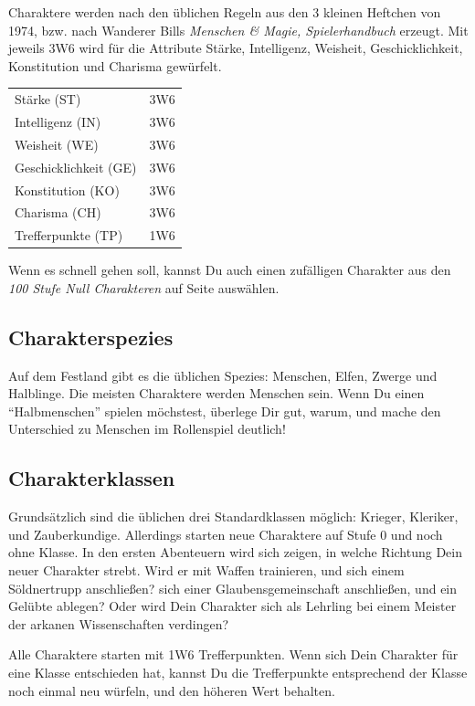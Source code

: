 \documentclass[11pt]{wbzine}
\begin{document}
\begin{multicols}{2}
Charaktere werden nach den üblichen Regeln aus den 3 kleinen
Heftchen von 1974, bzw. nach Wanderer Bills \textit{Menschen \&
Magie, Spielerhandbuch} erzeugt. Mit jeweils 3W6 wird für die
Attribute Stärke, Intelligenz, Weisheit, Geschicklichkeit,
Konstitution und Charisma gewürfelt.

\begin{tabularx}{\columnwidth}{Zc}
    Stärke (ST) & 3W6 \\
    Intelligenz (IN) & 3W6 \\
    Weisheit (WE) & 3W6 \\
    Geschicklichkeit (GE) & 3W6 \\
    Konstitution (KO) & 3W6 \\
    Charisma (CH) & 3W6 \\
    Trefferpunkte (TP) & 1W6 \\
\end{tabularx}

Wenn es schnell gehen soll, kannst Du auch einen zufälligen
Charakter aus den \textit{100 Stufe Null Charakteren} auf Seite
\pageref{100char} auswählen.

\subsection{Charakterspezies}

Auf dem Festland gibt es die üblichen Spezies: Menschen, Elfen,
Zwerge und Halblinge. Die meisten Charaktere werden Menschen sein.
Wenn Du einen ``Halbmenschen'' spielen möchstest, überlege Dir gut,
warum, und mache den Unterschied zu Menschen im Rollenspiel
deutlich!

\subsection{Charakterklassen}

Grundsätzlich sind die üblichen drei Standardklassen möglich:
Krieger, Kleriker, und Zauberkundige. Allerdings starten neue
Charaktere auf Stufe 0 und noch ohne Klasse. In den ersten
Abenteuern wird sich zeigen, in welche Richtung Dein neuer Charakter
strebt. Wird er mit Waffen trainieren, und sich einem Söldnertrupp
anschließen? sich einer Glaubensgemeinschaft anschließen, und ein
Gelübte ablegen? Oder wird Dein Charakter sich als Lehrling bei
einem Meister der arkanen Wissenschaften verdingen?

Alle Charaktere starten mit 1W6 Trefferpunkten. Wenn sich Dein
Charakter für eine Klasse entschieden hat, kannst Du die
Trefferpunkte entsprechend der Klasse noch einmal neu würfeln, und
den höheren Wert behalten.



\end{multicols}
\end{document}
